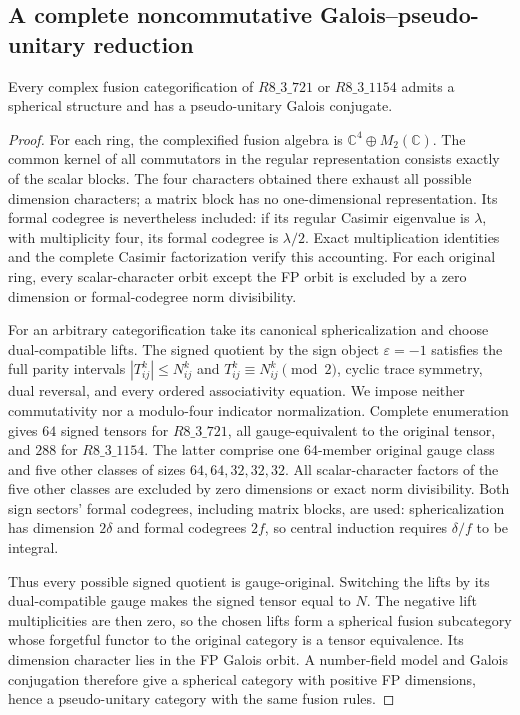 \subsection{A complete noncommutative Galois--pseudo-unitary reduction}
\label{subsec:frontier-nc-galois-pu}

\begin{proposition}
Every complex fusion categorification of $R8\_3\_721$ or $R8\_3\_1154$
admits a spherical structure and has a pseudo-unitary Galois conjugate.
\end{proposition}
\begin{proof}
For each ring, the complexified fusion algebra is
$\mathbb C^4\oplus M_2(\mathbb C)$. The common kernel of all commutators
in the regular representation consists exactly of the scalar blocks.
The four characters obtained there exhaust all possible dimension
characters; a matrix block has no one-dimensional representation.
Its formal codegree is nevertheless included: if its regular Casimir
eigenvalue is $\lambda$, with multiplicity four, its formal codegree is
$\lambda/2$. Exact multiplication identities and the complete Casimir
factorization verify this accounting. For each original ring, every scalar-character orbit
except the FP orbit is excluded by a zero dimension or formal-codegree
norm divisibility.

For an arbitrary categorification take its canonical sphericalization
and choose dual-compatible lifts. The signed quotient by the sign object
$\varepsilon=-1$ satisfies the full parity intervals
$|T_{ij}^k|\leq N_{ij}^k$ and $T_{ij}^k\equiv N_{ij}^k\pmod2$,
cyclic trace symmetry, dual reversal, and every ordered associativity
equation. We impose neither commutativity nor a modulo-four indicator
normalization. Complete enumeration gives $64$ signed tensors for
$R8\_3\_721$, all gauge-equivalent to the original tensor, and $288$
for $R8\_3\_1154$. The latter comprise one $64$-member original gauge
class and five other classes of sizes $64,64,32,32,32$.
All scalar-character factors of the five other classes are excluded by
zero dimensions or exact norm divisibility. Both sign sectors' formal
codegrees, including matrix blocks, are used: sphericalization has
dimension $2\delta$ and formal codegrees $2f$, so central induction
requires $\delta/f$ to be integral.

Thus every possible signed quotient is gauge-original. Switching the
lifts by its dual-compatible gauge makes the signed tensor equal to
$N$. The negative lift multiplicities are then zero, so the chosen
lifts form a spherical fusion subcategory whose forgetful functor to
the original category is a tensor equivalence. Its dimension character
lies in the FP Galois orbit. A number-field model and Galois conjugation
therefore give a spherical category with positive FP dimensions, hence
a pseudo-unitary category with the same fusion rules.
\end{proof}

